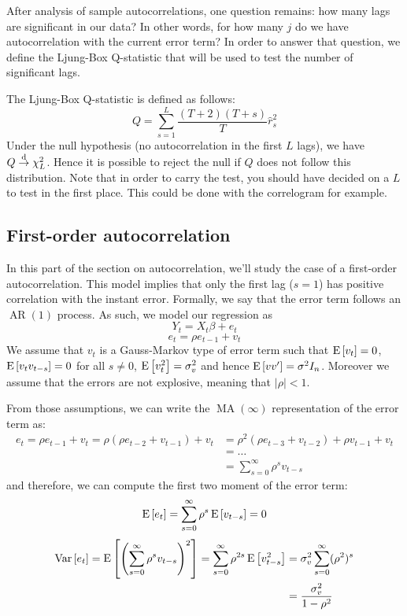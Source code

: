 After analysis of sample autocorrelations, one question remains: how many lags are significant in our data? In other words, for how many $j$ do we have autocorrelation with the current error term? In order to answer that question, we define the Ljung-Box Q-statistic that will be used to test the number of significant lags.

\begin{definition}
The Ljung-Box Q-statistic is defined as follows: $$Q = \sum_{s = 1}^{L} \frac{(T+2)(T+s)}{T} \hat r_s^2 $$ Under the null hypothesis (no autocorrelation in the first $L$ lags), we have $Q\overset{\text{d}}{\to} \chi_L^2$. Hence it is possible to reject the null if $Q$ does not follow this distribution. Note that in order to carry the test, you should have decided on a $L$ to test in the first place. This could be done with the correlogram for example.
\end{definition}

\subsection{First-order autocorrelation}

In this part of the section on autocorrelation, we'll study the case of a first-order autocorrelation. This model implies that only the first lag ($s=1$) has positive correlation with the instant error. Formally, we say that the error term follows an $\operatorname{AR}(1)$ process. As such, we model our regression as $$Y_t = X_t\beta + e_t $$ $$e_t = \rho e_{t-1} + v_t $$ We assume that $v_t$ is a Gauss-Markov type of error term such that $\operatorname{E}\left[v_t\right] = 0$, $\operatorname{E}\left[v_tv_{t-s}\right]=0$ for all $s\neq 0$, $\operatorname{E}\left[v_t^2\right] = \sigma_v^2$ and hence $\operatorname{E}\left[vv'\right] = \sigma^2I_n$. Moreover we assume that the errors are not explosive, meaning that $\vert\rho\vert < 1$. 

From those assumptions, we can write the $\operatorname{MA}(\infty)$ representation of the error term as: \begin{align*}
e_t = \rho e_{t-1} + v_t = \rho ( \rho e_{t-2} + v_{t-1}) + v_t & = \rho^2( \rho e_{t-3} + v_{t-2}) + \rho v_{t-1} + v_t \\ & = \dots \\ & = \sum_{s=0}^{\infty} \rho^s v_{t-s}
\end{align*} and therefore, we can compute the first two moment of the error term: $$ \operatorname{E}\left[e_t\right] = \sum_{s=0}^{\infty} \rho^s \operatorname{E}\left[v_{t-s}\right] = 0 $$ 
\begin{align*}
\operatorname{Var}\left[e_t\right] = \operatorname{E}\left[\left(\sum_{s=0}^{\infty} \rho^s v_{t-s}\right)^2\right] = \sum_{s=0}^{\infty} \rho^{2s} \operatorname{E}\left[v_{t-s}^2\right]  & = \sigma_{v}^2 \sum_{s=0}^{\infty} (\rho^{2})^s \\ & =  \frac{\sigma_{v}^2}{1 - \rho^2}
\end{align*}

